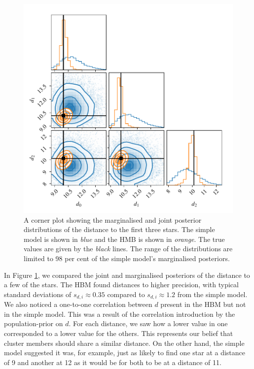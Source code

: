 
\begin{figure}[tb]
    \centering
    \includegraphics{figures/hbm-dist-corr.pdf}
    \caption{A corner plot showing the marginalised and joint posterior distributions of the distance to the first three stars. The simple model is shown in \emph{blue} and the HMB is shown in \emph{orange}. The true values are given by the \emph{black} lines. The range of the distributions are limited to 98 per cent of the simple model's marginalised posteriors.}
    \label{fig:hbm-corr}
\end{figure}

In Figure \ref{fig:hbm-corr}, we compared the joint and marginalised posteriors of the distance to a few of the stars. The HBM found distances to higher precision, with typical standard deviations of \(s_{d,i} \approx 0.35\) compared to \(s_{d,i} \approx 1.2\) from the simple model. We also noticed a one-to-one correlation between \(d\) present in the HBM but not in the simple model. This was a result of the correlation introduction by the population-prior on \(d\). For each distance, we saw how a lower value in one corresponded to a lower value for the others. This represents our belief that cluster members should share a similar distance. On the other hand, the simple model suggested it was, for example, just as likely to find one star at a distance of 9 and another at 12 as it would be for both to be at a distance of 11.

